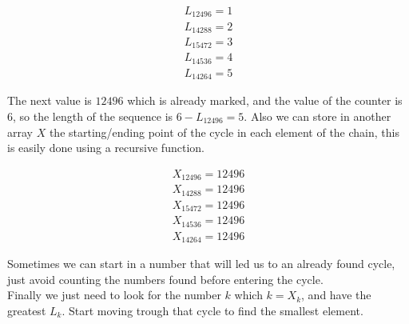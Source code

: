 \begin{align*}
    L_{12496} = 1 \\
    L_{14288} = 2 \\
    L_{15472} = 3 \\
    L_{14536} = 4 \\
    L_{14264} = 5
\end{align*}

The next value is $12496$ which is already marked, and the value of the counter is $6$, so the length of the sequence is $6 - L_{12496} = 5$. Also we can store in another array $X$ the starting/ending point of the cycle in each element of the chain, this is easily done using a recursive function.

\begin{align*}
    X_{12496} = 12496 \\
    X_{14288} = 12496 \\
    X_{15472} = 12496 \\
    X_{14536} = 12496 \\
    X_{14264} = 12496
\end{align*}

Sometimes we can start in a number that will led us to an already found cycle, just avoid counting the numbers found before entering the cycle.\\

Finally we just need to look for the number $k$ which $k = X_k$, and have the greatest $L_k$. Start moving trough that cycle to find the smallest element.